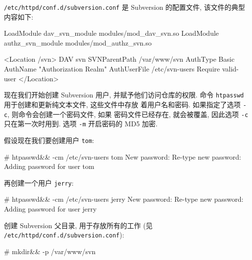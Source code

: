 \documentclass[nofonts, oneside]{ctexbook}
\newcommand\shellcmd[1]{\texttt{#1}}
\begin{document}
\texttt{/etc/httpd/conf.d/subversion.conf} 是 Subversion
的配置文件, 该文件的典型内容如下:
\begin{svnshell}
LoadModule dav_svn_module   modules/mod_dav_svn.so
LoadModule authz_svn_module modules/mod_authz_svn.so

<Location /svn>
    DAV svn
    SVNParentPath /var/www/svn
    AuthType Basic
    AuthName "Authorization Realm"
    AuthUserFile /etc/svn-users
    Require valid-user
</Location>
\end{svnshell}

现在我们开始创建 Subversion 用户, 并赋予他们访问仓库的权限. 命令
\shellcmd{htpasswd} 用于创建和更新纯文本文件,
这些文件中存放
着用户名和密码. 如果指定了选项 \shellcmd{-c}, 则命令会创建一个密码文件, 如果
密码文件已经存在, 就会被覆盖, 因此选项 \shellcmd{-c} 只在第一次时用到. 选项
\shellcmd{-m} 开启密码的 MD5 加密.

假设现在我们要创建用户 \texttt{tom}:
\begin{svnshell}
# htpasswd&& -cm /etc/svn-users tom
New password:
Re-type new password:
Adding password for user tom
\end{svnshell}

再创建一个用户 \texttt{jerry}:
\begin{svnshell}
# htpasswd&& -cm /etc/svn-users jerry
New password:
Re-type new password:
Adding password for user jerry
\end{svnshell}

创建 Subversion 父目录, 用于存放所有的工作  (见
\texttt{/etc/httpd/conf.d/subversion.conf}):
\begin{svnshell}
# mkdir&& -p /var/www/svn
\end{svnshell}
\end{document}
